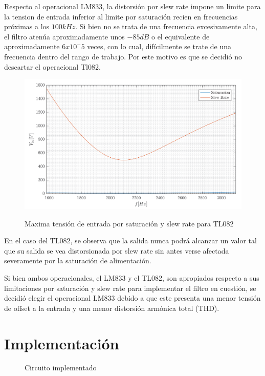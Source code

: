 Respecto al operacional LM833, la distorsión por slew rate impone un limite para la tension de entrada inferior al limite por saturación recien en frecuencias próximas a los $100 kHz$. Si bien no se trata de una frecuencia excesivamente alta, el filtro atenúa aproximadamente unos $-85 dB$ o el equivalente de aproximadamente $6x10^-5$ veces, con lo cual, difícilmente se trate de una frecuencia dentro del rango de trabajo. Por este motivo es que se decidió no descartar el operacional Tl082.

\begin{figure}[H]
\centering
\includegraphics[scale=0.4]{resources/vin_max_TL082}
\label{1_vin_max_TL082}
\caption{Maxima tensión de entrada por saturación y slew rate para TL082}
\end{figure}

En el caso del TL082, se observa que la salida nunca podrá alcanzar un valor tal que su salida se vea distorsionada por slew rate sin antes verse afectada severamente por la saturación de alimentación. 

Si bien ambos operacionales, el LM833 y el TL082, son apropiados respecto a sus limitaciones por saturación y slew rate para implementar el filtro en cuestión, se decidió elegir el operacional LM833 debido a que este presenta una menor tensión de offset a la entrada y una menor distorsión armónica total (THD).

\section{Implementación}

\begin{figure}[ht]
\centering

\caption{Circuito implementado}
\label{1_circuito_implementado}
\end{figure}

